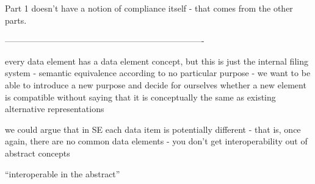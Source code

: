 Part 1 doesn't have a notion of compliance itself - that comes from
the other parts. 

----------------------------------------------------------------------

every data element has a data element concept, but this is just the
internal filing system - semantic equivalence according to no
particular purpose - we want to be able to introduce a new purpose and
decide for ourselves whether a new element is compatible without
saying that it is conceptually the same as existing alternative
representations

we could argue that in SE each data item is potentially different
- that is, once again, there are no common data elements - you don't
get interoperability out of abstract concepts 

``interoperable in the abstract''

